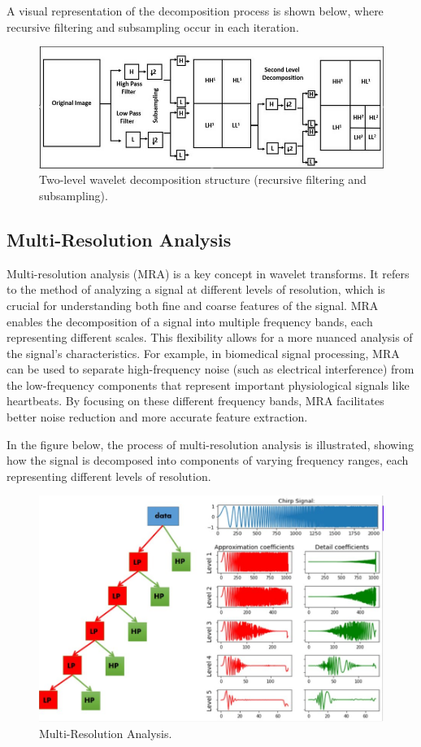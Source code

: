 \documentclass[conference]{IEEEtran}
\begin{document}
A visual representation of the decomposition process is shown below, where recursive filtering and subsampling occur in each iteration.

\begin{figure}[h] \centering \includegraphics[width=0.8\linewidth]{Images/wavelet-decomposition.png} \caption{Two-level wavelet decomposition structure (recursive filtering and subsampling).} \label{fig:wavelet decomposition} \end{figure}

\subsection{Multi-Resolution Analysis} Multi-resolution analysis (MRA) is a key concept in wavelet transforms. It refers to the method of analyzing a signal at different levels of resolution, which is crucial for understanding both fine and coarse features of the signal. MRA enables the decomposition of a signal into multiple frequency bands, each representing different scales. This flexibility allows for a more nuanced analysis of the signal’s characteristics. For example, in biomedical signal processing, MRA can be used to separate high-frequency noise (such as electrical interference) from the low-frequency components that represent important physiological signals like heartbeats. By focusing on these different frequency bands, MRA facilitates better noise reduction and more accurate feature extraction.

In the figure below, the process of multi-resolution analysis is illustrated, showing how the signal is decomposed into components of varying frequency ranges, each representing different levels of resolution.

\begin{figure}[h] \centering \includegraphics[width=0.8\linewidth]{Images/multi-resolution analysis.png} \caption{Multi-Resolution Analysis.} \label{fig:multiresolution analysis} \end{figure}
\end{document}
